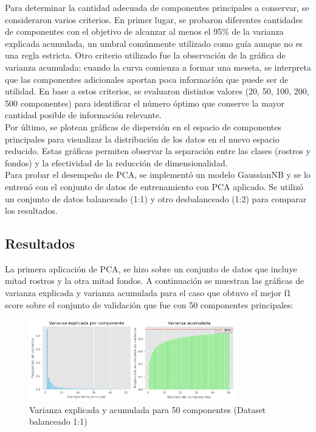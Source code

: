 \documentclass{article}
\begin{document}
Para determinar la cantidad adecuada de componentes principales a conservar, se consideraron varios criterios. En primer lugar, se probaron diferentes cantidades de componentes con el objetivo de alcanzar al menos el 95\% de la varianza explicada acumulada, un umbral comúnmente utilizado como guía aunque no es una regla estricta. Otro criterio utilizado fue la observación de la gráfica de varianza acumulada: cuando la curva comienza a formar una meseta, se interpreta que las componentes adicionales aportan poca información que puede ser de utilidad. En base a estos criterios, se evaluaron distintos valores (20, 50, 100, 200, 500 componentes) para identificar el número óptimo que conserve la mayor cantidad posible de información relevante.\\

Por último, se plotean gráficas de dispersión en el espacio de componentes principales para visualizar la distribución de los datos en el nuevo espacio reducido. Estas gráficas permiten observar la separación entre las clases (rostros y fondos) y la efectividad de la reducción de dimensionalidad.\\

Para probar el desempeño de PCA, se implementó un modelo GaussianNB y se lo entrenó con el conjunto de datos de entrenamiento con PCA aplicado. Se utilizó un conjunto de datos balanceado (1:1) y otro desbalanceado (1:2) para comparar los resultados.

\subsection*{Resultados}


La primera aplicación de PCA, se hizo sobre un conjunto de datos que incluye mitad rostros y la otra mitad fondos. A continuación se muestran las gráficas de varianza explicada y varianza acumulada para el caso que obtuvo el mejor f1 score sobre el conjunto de validación que fue con 50 componentes principales:\\

\begin{figure}[H]
    \centering
    \includegraphics[width=0.8\textwidth]{tarea_2/imagenes/variance_x1_v1_50.png}
    \caption{Varianza explicada y acumulada para 50 componentes (Dataset balanceado 1:1)}
    \label{fig:pca_componentes}
\end{figure}
\end{document}
